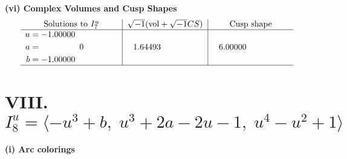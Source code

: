 \documentclass[1p]{elsarticle_modified}
\theoremstyle{definition}
\newcommand{\I}{\sqrt{-1}}
\begin{document}
\newpage\flushleft \textbf{(vi) Complex Volumes and Cusp Shapes}
$$\begin{array}{c|c|c}  
\text{Solutions to }I^u_{7}& \I (\text{vol} + \sqrt{-1}CS) & \text{Cusp shape}\\
 \hline 
\begin{aligned}
u &= -1.00000\phantom{ +0.000000I} \\
a &= \phantom{-0.000000 } 0 \\
b &= -1.00000\phantom{ +0.000000I}\end{aligned}
 & \phantom{-}1.64493\phantom{ +0.000000I} & \phantom{-}6.00000\phantom{ +0.000000I}\\
 \hline 
 \end{array}$$\newpage\newpage\renewcommand{\arraystretch}{1}
\centering \section*{VIII. $I^u_{8}= \langle - u^3+b,\;u^3+2 a-2 u-1,\;u^4- u^2+1 \rangle$}
\flushleft \textbf{(i) Arc colorings}\\
\end{document}
